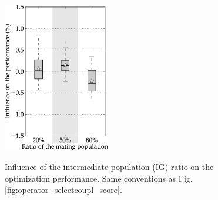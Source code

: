 \documentclass{ametsoc}
\begin{document}
\begin{figure}[t]
	\begin{center}
		\noindent\includegraphics[width=11pc,angle=0]{fig13.pdf}\\
	\end{center}
	\caption{Influence of the intermediate population (IG) ratio on the optimization performance. Same conventions as Fig. \ref{fig:operator_selectcoupl_score}.}
	\label{fig:option_popratio_score}
\end{figure}
\end{document}
